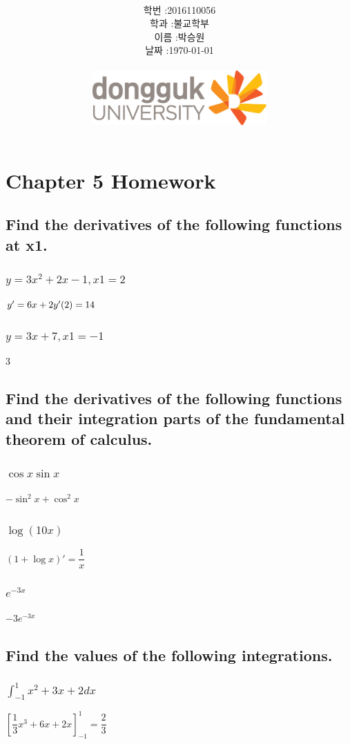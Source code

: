 \documentclass[12pt,a4paper]{article}
\title{
	\centering
	\pgfornament[width=12cm,color=teal]{84}\\
	\vspace{1cm}
	\fontsize{50}{50} \selectfont {정보통신 수학 및 실습\\Homework}\\
		\pgfornament[width=12cm,color=teal]{88}\\
	\vfill}
\author{
	\LARGE
	\begin{tabular}{rl}
		\hline
		학번 : & 2016110056\\ 
		학과 : & 불교학부 \\
		이름 : & 박승원\\
		날짜 : & \today\\
		\hline
	\end{tabular}\vspace{2cm}
	\\
\includegraphics[width=0.5\textwidth]{logo.jpg}
	}
\date{}
\begin{document}
\maketitle
{}
\noindent
\lstset{language=matlab, columns=flexible, tabsize=4, frame=shadowbox, showstringspaces=false, breaklines=true, upquote=true, basicstyle=\normalsize}

\renewcommand{\thesubsubsection}{\alph{subsubsection})}
\renewcommand{\thesubsection}{\arabic{subsection}.}
\newpage
\section*{Chapter 5 Homework}
\subsection{Find the derivatives of the following functions at x1.} 
\subsubsection{$y= 3x^2+2x-1, x1=2$}  
$y' = 6x + 2\\ y'(2) = 14$
\subsubsection{$y= 3x+7, x1=-1$}
3
\subsection{Find the derivatives of the following functions and their integration parts of the fundamental theorem of calculus.} 
\subsubsection{$\cos x\sin x$} 
$-\sin^2 x+\cos^2 x$
\subsubsection{$\log(10x)$}
$(1 + \log x)' = \dfrac{1}{x}$
\subsubsection{$e^{-3x}$} 
$-3e^{-3x}$

\subsection{Find the values of the following integrations.} 
\subsubsection{$\displaystyle\int_{-1}^1 x^2+3x+2 dx$}
$\left[ \dfrac{1}{3}x^3+6x+2x \right]_{-1}^1 = \dfrac{2}{3}$
\end{document}
